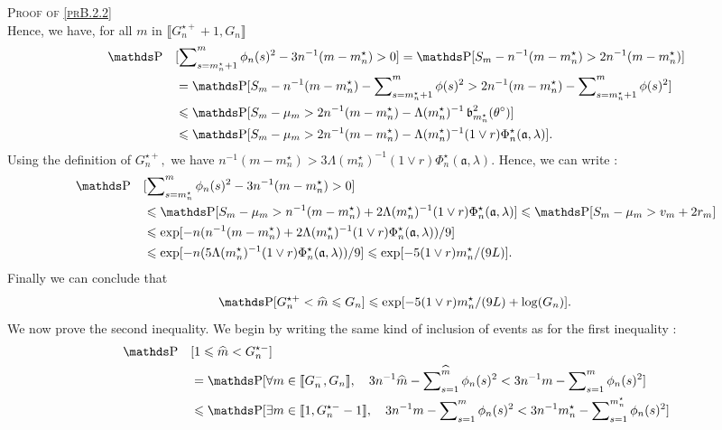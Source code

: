 \begin{pro}{\textsc{Proof of \textsc{\cref{prB.2.2}}} \\}
Hence, we have, for all $m$ in $\llbracket G_{n}^{\star+} + 1, G_{n}\rrbracket$
\begin{alignat*}{2}
& \P&&[\sum\nolimits_{s= m_{n}^{\star} + 1}^{m} \phi_{n}(s)^{2} - 3 n^{-1} (m - m_{n}^{\star}) > 0] = \P[S_{m} - n^{-1}(m - m_{n}^{\star}) > 2 n^{-1}(m - m_{n}^{\star}) ]\\
& && = \P[S_{m} - n^{-1}(m - m_{n}^{\star}) - \sum\nolimits_{s= m_{n}^{\star} + 1}^{m} \phi(s)^{2} > 2 n^{-1}(m - m_{n}^{\star}) - \sum\nolimits_{s= m_{n}^{\star} + 1}^{m} \phi(s)^{2}]\\
& && \leq \P[S_{m} - \mu_{m} > 2 n^{-1}(m - m_{n}^{\star}) - \Lambda(m_{n}^{\star})^{-1} \b_{m_{n}^{\star}}^{2}(\theta^{\circ})]\\
& && \leq \P[S_{m} - \mu_{m} > 2 n^{-1}(m - m_{n}^{\star}) - \Lambda(m_{n}^{\star})^{-1} (1 \vee r) \Phi_{n}^{\star}(\mathfrak{a}, \lambda) ].
\end{alignat*}
Using the definition of $G_{n}^{\star+},$ we have $n^{-1}(m - m_{n}^{\star}) > 3 \Lambda(m_{n}^{\star})^{-1}(1 \vee r) \Phi_{n}^{\star}(\mathfrak{a}, \lambda)$.
Hence, we can write :
\begin{alignat*}{2}
& \P&&[\sum\nolimits_{s= m_{n}^{\star}}^{m} \phi_{n}(s)^{2} - 3 n^{-1}(m - m_{n}^{\star}) > 0]\\
& &&\leq \P[S_{m} - \mu_{m} > n^{-1}(m - m_{n}^{\star}) + 2 \Lambda(m_{n}^{\star})^{-1} (1 \vee r ) \Phi_{n}^{\star}(\mathfrak{a}, \lambda)] \leq \P[S_{m} - \mu_{m} > v_{m} + 2 r_{m}]\\
& &&\leq \exp[- n (n^{-1} (m - m_{n}^{\star}) + 2 \Lambda(m_{n}^{\star})^{-1} (1 \vee r) \Phi_{n}^{\star}(\mathfrak{a}, \lambda))/9 ]\\
& &&\leq \exp[- n (5 \Lambda(m_{n}^{\star})^{-1} ( 1 \vee r) \Phi_{n}^{\star}(\mathfrak{a}, \lambda))/9] \leq \exp[- 5 ( 1 \vee r) m_{n}^{\star}/(9 L)].
\end{alignat*}
Finally we can conclude that
\[\P[G_{n}^{\star+} < \widehat{m} \leq G_{n}] \leq \exp[- 5 ( 1 \vee r) m_{n}^{\star}/(9 L) + \log(G_{n})].\]
We now prove the second inequality.
We begin by writing the same kind of inclusion of events as for the first inequality :
\begin{alignat*}{2}
& \P &&[1 \leq \widehat{m} < G_{n}^{\star-}]\\
& &&= \P [ \forall m \in \llbracket G_{n}^{-}, G_{n} \rrbracket, \quad 3 n^{-1} \widehat{m} - \sum\nolimits_{s= 1}^{\widehat{m}} \phi_{n}(s)^{2} < 3 n^{-1}m - \sum\nolimits_{s= 1}^{m} \phi_{n}(s)^{2}]\\
& && \leq \P [ \exists m \in \llbracket 1, G_{n}^{\star-} -1 \rrbracket, \quad 3 n^{-1}m - \sum\nolimits_{s= 1}^{m} \phi_{n}(s)^{2} < 3 n^{-1} m_{n}^{\star} - \sum\nolimits_{s= 1}^{m_{n}^{\star}} \phi_{n}(s)^{2}]\\

\end{alignat*}
\end{pro}

